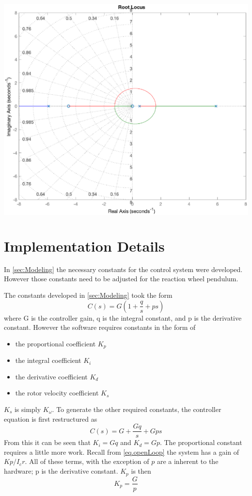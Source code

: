 \documentclass[12pt,letterpaper]{article}
\begin{document}
\includegraphics[width=\textwidth]{images/rootLocusFull.eps} 
    \label{rootLocusFull}

\section{Implementation Details}

In \autoref{sec:Modeling} the necessary constants for the control system were developed.  However those constants
need to be adjusted for the reaction wheel pendulum.

The constants developed in \autoref{sec:Modeling} took the form
\begin{equation}
	C(s) = G(1 + \frac{q}{s} + p s)
\end{equation}
where G is the controller gain, q is the integral constant, and p is the derivative constant.  However the software requires
constants in the form of 
\begin{itemize}
    \item the proportional coefficient $K_{p}$
    \item the integral coefficient $K_{i}$
    \item the derivative coefficient $K_{d}$
    \item the rotor velocity coefficient $K_{s}$
\end{itemize}

$K_{s}$ is simply $K_{\omega}$.  To generate the other required constants, the controller equation is first restructured as
\begin{equation}
	C(s) = G + \frac{Gq}{s} + Gps
\end{equation}
From this it can be seen that $K_{i} = Gq$ and $K_{d} = Gp$.  The proportional constant requires a little more work.
Recall from \eqref{eq.openLoop} the system has a gain of $Kp/I_{c}r$.  All of these terms, with the exception of $p$ are a inherent to the hardware; p
is the derivative constant. $K_{p}$ is then
\begin{equation}
K_{p} = \frac{G} {p}
\end{equation}
\end{document}
